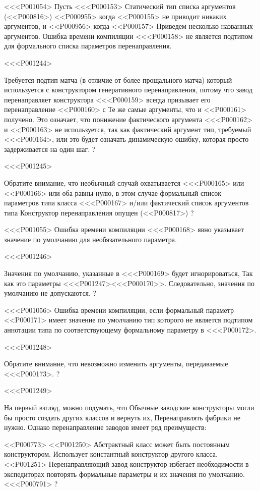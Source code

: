 {{{{{{{{{{{{<<<P001054>%
Пусть <<<P000153> Статический тип списка аргументов
(<<P000816>)
<<P000955>
когда <<P000155> не приводит никаких аргументов, и
<<P000956>
когда <<P000157> Приведем несколько названных аргументов.
Ошибка времени компиляции <<<P000158>
не является подтипом для формального списка параметров перенаправления.

<<<P001244>{%
Требуется подтип матча
(в отличие от более прощального матча)
который используется с конструктором генеративного перенаправления,
потому что завод перенаправляет конструктора <<<P000159> всегда призывает
его перенаправление <<P000160> с
Те же самые аргументы, что и <<P000161> получено.
Это означает, что понижение фактического аргумента
<<<P000162> и <<P000163>
не используется, так как фактический аргумент
тип, требуемый <<<P000164>,
или это будет означать динамическую ошибку, которая просто задерживается на один шаг.
?

<<<P001245>{%
Обратите внимание, что необычный случай охватывается
<<<P000165> или <<P000166> или оба равны нулю,
в этом случае формальный список параметров типа класса <<<P000167>
и/или фактический список аргументов типа
Конструктор перенаправления опущен
(<<P000817>)%
?

<<<P001055>%
Ошибка времени компиляции <<<P000168> явно указывает
значение по умолчанию для необязательного параметра.

<<<P001246>{%
Значения по умолчанию, указанные в <<<P000169> будет игнорироваться,
Так как это параметры <<<P001247><<<P000170>>.
Следовательно, значения по умолчанию не допускаются.%
?

<<<P001056>%
Ошибка времени компиляции, если формальный параметр <<P000171> имеет значение по умолчанию
тип которого не является подтипом аннотации типа
по соответствующему формальному параметру в <<<P000172>.

<<<P001248>{%
Обратите внимание, что невозможно изменить аргументы, передаваемые <<<P000173>.%
?

<<<P001249>{%
На первый взгляд, можно подумать, что
Обычные заводские конструкторы могли бы просто создать
других классов и вернуть их,
Перенаправлять фабрики не нужно.
Однако перенаправление заводов имеет ряд преимуществ:

<<P000773>
<<P001250>
Абстрактный класс может быть постоянным конструктором.
Использует константный конструктор другого класса.
<<P001251>
Перенаправляющий завод-конструктор избегает необходимости в экспедиторах
повторять формальные параметры и их значения по умолчанию.
<<<P000791>%
?

}}}}}}}}}}}}}}}}}
